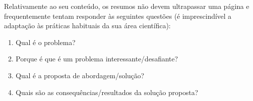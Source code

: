 
%

Relativamente ao seu conteúdo, os resumos não devem ultrapassar uma página e frequentemente tentam responder às seguintes questões (é imprescindível a adaptação às práticas habituais da sua área científica):

\begin{enumerate}
  \item Qual é o problema?
  \item Porque é que é um problema interessante/desafiante?
  \item Qual é a proposta de abordagem/solução?
  \item Quais são as consequências/resultados da solução proposta?
\end{enumerate}

